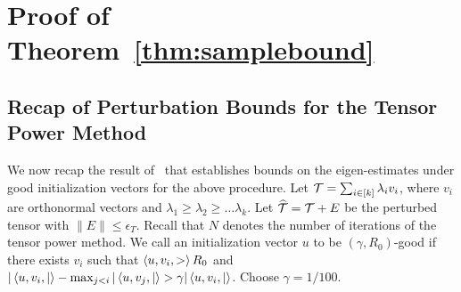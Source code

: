%

\section{Proof of Theorem~\ref{thm:samplebound}}\label{app:samplebound}

\subsection{Recap of Perturbation Bounds for the Tensor Power Method}

We now recap the result of~\citet[Thm. 13]{AnandkumarEtal:community12} that establishes bounds on the eigen-estimates under good initialization vectors for the above procedure.
Let ${\mathcal{T}}=\sum_{i\in [k]}\lambda_i v_i$, where $v_i$ are orthonormal vectors and $\lambda_1\geq \lambda_2\geq\ldots \lambda_k$. Let $\widehat{{\mathcal{T}}}={\mathcal{T}}+E$ be the perturbed tensor with $\|E\|\leq \epsilon_{T}$. Recall that $N$ denotes the number of iterations of the tensor power method.
We call an initialization vector $u$ to be $(\gamma, R_0)$-good  if there exists $v_i$ such that $\left\langle u, v_i,> \right\rangle R_0$
  and $|\left\langle u, v_i,| \right\rangle -\max_{j<i} |\left\langle u,v_j,| \right\rangle > \gamma  |\left\langle u,v_i,| \right\rangle$.   Choose $\gamma=1/100$.


